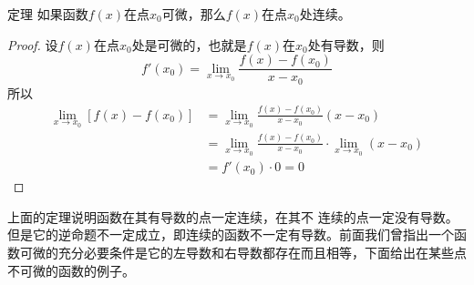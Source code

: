 \begin{blk}
    {定理} 如果函数$f(x)$在点$x_0$可微，那么$f(x)$在点$x_0$处连续。
\end{blk}

\begin{proof}
设$f(x)$在点$x_0$处是可微的，也就是$f(x)$在$x_0$处有导数，则
\[f'(x_0)=\lim_{x\to x_0}\frac{f(x)-f(x_0)}{x-x_0}\]
所以
\[\begin{split}
    \lim_{x\to x_0}[f(x)-f(x_0)]&=\lim_{x\to x_0}\frac{f(x)-f(x_0)}{x-x_0}(x-x_0)\\
    &=\lim_{x\to x_0}\frac{f(x)-f(x_0)}{x-x_0}\cdot \lim_{x\to x_0}(x-x_0)\\
&=f'(x_0)\cdot 0=0
\end{split}\]
\end{proof}

上面的定理说明函数在其有导数的点一定连续，在其不
连续的点一定没有导数。但是它的逆命题不一定成立，即连续的函数不一定有导数。前面我们曾指出一个函数可微的充分必要条件是它的左导数和右导数都存在而且相等，下面给出在某些点不可微的函数的例子。













\begin{example}
    
\end{example}

    
\begin{solution}
    
\end{solution}

\begin{example}
    
\end{example}




